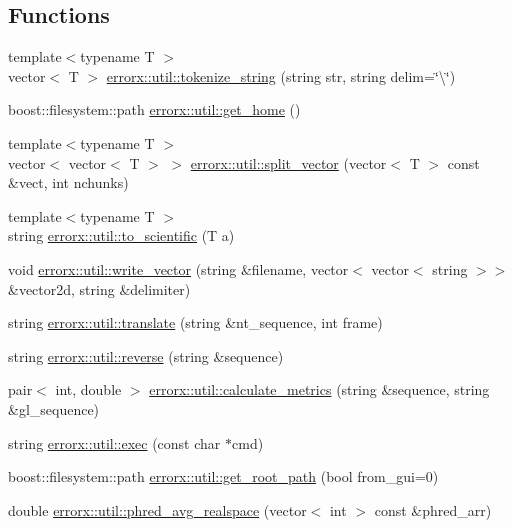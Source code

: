 \subsection*{Functions}
\begin{DoxyCompactItemize}
\item 
{\footnotesize template$<$typename T $>$ }\\vector$<$ T $>$ \mbox{\hyperlink{util_8hh_acc497c681cf24c9bff556e8acd63e7e6}{errorx\+::util\+::tokenize\+\_\+string}} (string str, string delim=\char`\"{}\textbackslash{}\char`\"{})
\item 
boost\+::filesystem\+::path \mbox{\hyperlink{util_8hh_adca61ce66f8a3bf65a941f50177cfa9c}{errorx\+::util\+::get\+\_\+home}} ()
\item 
{\footnotesize template$<$typename T $>$ }\\vector$<$ vector$<$ T $>$ $>$ \mbox{\hyperlink{util_8hh_a5be6bd3e6a08f8e1aff1263fbee80f9a}{errorx\+::util\+::split\+\_\+vector}} (vector$<$ T $>$ const \&vect, int nchunks)
\item 
{\footnotesize template$<$typename T $>$ }\\string \mbox{\hyperlink{util_8hh_af715e802c3f11065f3f5474652ab472c}{errorx\+::util\+::to\+\_\+scientific}} (T a)
\item 
void \mbox{\hyperlink{util_8hh_ae2024a02b2f039f828e93b98cc0b239d}{errorx\+::util\+::write\+\_\+vector}} (string \&filename, vector$<$ vector$<$ string $>$$>$ \&vector2d, string \&delimiter)
\item 
string \mbox{\hyperlink{util_8hh_af1850eec85f3a83033418281ebaefd80}{errorx\+::util\+::translate}} (string \&nt\+\_\+sequence, int frame)
\item 
string \mbox{\hyperlink{util_8hh_adf449550860128c73a9261938d3077ee}{errorx\+::util\+::reverse}} (string \&sequence)
\item 
pair$<$ int, double $>$ \mbox{\hyperlink{util_8hh_aa88ff24aa9d13330c57cc66beb4ca714}{errorx\+::util\+::calculate\+\_\+metrics}} (string \&sequence, string \&gl\+\_\+sequence)
\item 
string \mbox{\hyperlink{util_8hh_a79883d5134a18ccdf9acde504a5b735d}{errorx\+::util\+::exec}} (const char $\ast$cmd)
\item 
boost\+::filesystem\+::path \mbox{\hyperlink{util_8hh_a4cec107c2b54f9cc7661fbeab8f814fb}{errorx\+::util\+::get\+\_\+root\+\_\+path}} (bool from\+\_\+gui=0)
\item 
double \mbox{\hyperlink{util_8hh_ab94184c848ba0a5c7d4e340a5b1dbfa7}{errorx\+::util\+::phred\+\_\+avg\+\_\+realspace}} (vector$<$ int $>$ const \&phred\+\_\+arr)
$$
\end{DoxyCompactItemize}
